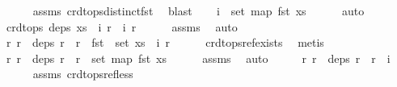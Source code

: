 \begin{isabellebody}
\ \ \ \ \isamarkupfalse%
\ assms{\isacharparenleft}{}{\isacharparenright}\ crdt{\isacharunderscore}ops{\isacharunderscore}distinct{\isacharunderscore}fst\ \isamarkupfalse%
\ blast\isanewline
\ \ \isamarkupfalse%
\ {\isachardoublequoteopen}i{}\ {\isasymnotin}\ set\ {\isacharparenleft}map\ fst\ xs{\isacharparenright}{\isachardoublequoteclose}\isanewline
\ \ \ \ \isamarkupfalse%
\ auto\isanewline
\ \ \isamarkupfalse%
\ \isamarkupfalse%
\ {\isachardoublequoteopen}crdt{\isacharunderscore}ops\ deps\ {\isacharparenleft}{\isacharparenleft}xs\ {\isacharat}\ {\isacharbrackleft}{\isacharparenleft}i{}{\isacharcomma}\ r{}{\isacharparenright}{\isacharbrackright}{\isacharparenright}\ {\isacharat}\ {\isacharbrackleft}{\isacharparenleft}i{}{\isacharcomma}\ r{}{\isacharparenright}{\isacharbrackright}{\isacharparenright}{\isachardoublequoteclose}\isanewline
\ \ \ \ \isamarkupfalse%
\ assms{\isacharparenleft}{}{\isacharparenright}\ \isamarkupfalse%
\ auto\isanewline
\ \ \isamarkupfalse%
\ {\isachardoublequoteopen}{\isasymAnd}r{\isachardot}\ r\ {\isasymin}\ deps\ r{}\ {\isasymLongrightarrow}\ r\ {\isasymin}\ fst\ {\isacharbackquote}\ set\ {\isacharparenleft}xs\ {\isacharat}\ {\isacharbrackleft}{\isacharparenleft}i{}{\isacharcomma}\ r{}{\isacharparenright}{\isacharbrackright}{\isacharparenright}{\isachardoublequoteclose}\isanewline
\ \ \ \ \isamarkupfalse%
\ crdt{\isacharunderscore}ops{\isacharunderscore}ref{\isacharunderscore}exists\ \isamarkupfalse%
\ metis\isanewline
\ \ \isamarkupfalse%
\ {\isachardoublequoteopen}{\isasymAnd}r{\isachardot}\ r\ {\isasymin}\ deps\ r{}\ {\isasymLongrightarrow}\ r\ {\isasymin}\ set\ {\isacharparenleft}map\ fst\ xs{\isacharparenright}{\isachardoublequoteclose}\isanewline
\ \ \ \ \isamarkupfalse%
\ assms{\isacharparenleft}{}{\isacharparenright}\ \isamarkupfalse%
\ auto\isanewline
\ \ \isamarkupfalse%
\ \isamarkupfalse%
\ {\isachardoublequoteopen}{\isasymAnd}r{\isachardot}\ r\ {\isasymin}\ deps\ r{}\ {\isasymLongrightarrow}\ r\ {\isacharless}\ i{}{\isachardoublequoteclose}\isanewline
\ \ \ \ \isamarkupfalse%
\ assms{\isacharparenleft}{}{\isacharparenright}\ crdt{\isacharunderscore}ops{\isacharunderscore}ref{\isacharunderscore}less\ \isamarkupfalse%

\end{isabellebody}
